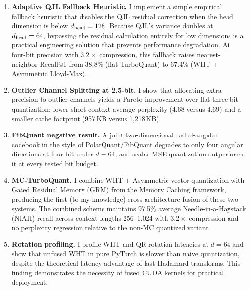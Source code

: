 \begin{enumerate}[noitemsep,topsep=1pt,parsep=0pt,partopsep=0pt]

\item \textbf{Adaptive QJL Fallback Heuristic.}
I implement a simple empirical fallback heuristic that disables the QJL residual correction when the head dimension is below $d_{\text{head}} = 128$. Because QJL's variance doubles at $d_{\text{head}} = 64$, bypassing the residual calculation entirely for low dimensions is a practical engineering solution that prevents performance degradation. At four-bit precision with $3.2{\times}$ compression, this fallback raises nearest-neighbor Recall@1 from 38.8\% (flat TurboQuant) to 67.4\% (WHT + Asymmetric Lloyd-Max).

\item \textbf{Outlier Channel Splitting at 2.5-bit.}
I show that allocating extra precision to outlier channels yields a
Pareto improvement over flat three-bit quantization: lower short-context
average perplexity (4.68 versus 4.69) and a smaller cache footprint
(957\,KB versus 1{,}218\,KB).

\item \textbf{FibQuant negative result.}
A joint two-dimensional radial-angular codebook in the style of
PolarQuant/FibQuant degrades to only four angular directions at four-bit
under $d = 64$, and scalar MSE quantization outperforms it at every
tested bit budget.

\item \textbf{MC-TurboQuant.}
I combine WHT + Asymmetric vector quantization with Gated Residual
Memory (GRM) from the Memory Caching framework, producing the first
(to my knowledge) cross-architecture fusion of these two systems.
The combined scheme maintains 97.5\% average Needle-in-a-Haystack
(NIAH) recall across context lengths 256--1{,}024 with $3.2{\times}$
compression and no perplexity regression relative to the non-MC
quantized variant.

\item \textbf{Rotation profiling.}
I profile WHT and QR rotation latencies at $d = 64$ and show that
unfused WHT in pure PyTorch is slower than naive quantization, despite
the theoretical latency advantage of fast Hadamard transforms. This finding
demonstrates the necessity of fused CUDA kernels for practical
deployment.


\end{enumerate}
